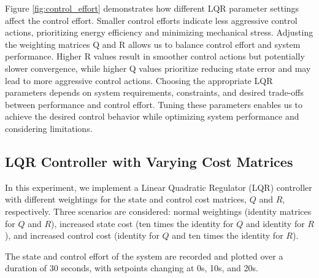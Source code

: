 \documentclass[11pt,twocolumn,twoside,lineno]{pnas-new}
\begin{document}
Figure \ref{fig:control_effort} demonstrates how different LQR parameter settings affect the control effort. Smaller control efforts indicate less aggressive control actions, prioritizing energy efficiency and minimizing mechanical stress. Adjusting the weighting matrices Q and R allows us to balance control effort and system performance. Higher R values result in smoother control actions but potentially slower convergence, while higher Q values prioritize reducing state error and may lead to more aggressive control actions. Choosing the appropriate LQR parameters depends on system requirements, constraints, and desired trade-offs between performance and control effort. Tuning these parameters enables us to achieve the desired control behavior while optimizing system performance and considering limitations.

\subsection{LQR Controller with Varying Cost Matrices}
In this experiment, we implement a Linear Quadratic Regulator (LQR) controller with different weightings for the state and control cost matrices, $Q$ and $R$, respectively. Three scenarios are considered: normal weightings (identity matrices for $Q$ and $R$), increased state cost (ten times the identity for $Q$ and identity for $R$), and increased control cost (identity for $Q$ and ten times the identity for $R$).

The state and control effort of the system are recorded and plotted over a duration of 30 seconds, with setpoints changing at 0s, 10s, and 20s.
\end{document}
